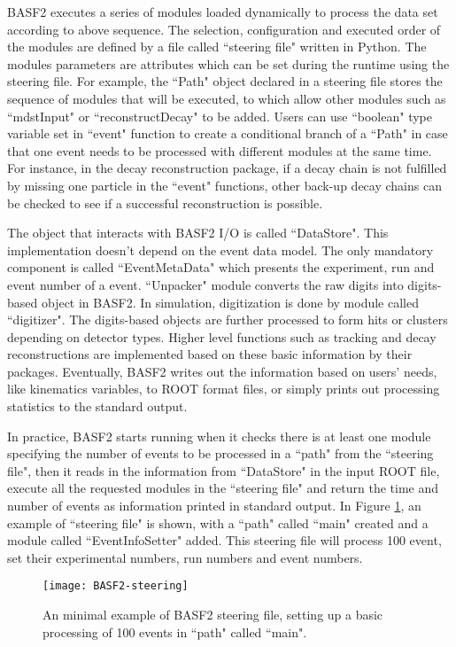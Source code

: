 BASF2 executes a series of modules loaded dynamically to process the data set according to above sequence. The selection, configuration and executed order of the modules are defined by a file called ``steering file" written in Python. The modules parameters are attributes which can be set during the runtime using the steering file. For example, the ``Path" object declared in a steering file stores the sequence of modules that will be executed, to which allow other modules such as ``mdstInput" or ``reconstructDecay" to be added.
Users can use ``boolean" type variable set in ``event" function to create a conditional branch of a ``Path" in case that one event needs to be processed with different modules at the same time. For instance, in the decay reconstruction package, if a decay chain is not fulfilled by missing one particle in the ``event" functions, other back-up decay chains can be checked to see if a successful reconstruction is possible.  

The object that interacts with BASF2 I/O is called ``DataStore". This implementation doesn't depend on the event data model. The only mandatory component is called ``EventMetaData" which presents the experiment, run  and event number of a event. ``Unpacker" module converts the raw digits into digits-based object in BASF2. In simulation, digitization is done by module called ``digitizer". The digits-based objects are further processed to form hits or clusters depending on detector types. Higher level functions such as tracking and decay reconstructions are implemented based on these basic information by their packages. Eventually, BASF2 writes out the information based on users' needs, like kinematics variables, to ROOT\cite{ROOTcern} format files, or simply prints out processing statistics to the standard output.

 In practice, BASF2 starts running when it checks there is at least one module specifying the number of events to be processed in a ``path"  from the ``steering file", then it reads in the information from ``DataStore" in the input ROOT file, execute all the requested modules in the ``steering file" and return the time and number of events as information printed in standard output. In Figure  \ref{fig:basf2_eg}, an example of ``steering file" is shown, with a ``path" called ``main" created and a module called ``EventInfoSetter" added. This steering file will process 100 event, set their experimental numbers, run numbers and event numbers.

\begin{figure}[htbp]
	\centering
	\texttt{[image: BASF2-steering]}
	\caption{ An minimal example of BASF2 steering file, setting up a basic processing of 100 events in ``path" called ``main". }
	\label{fig:basf2_eg}
\end{figure}






